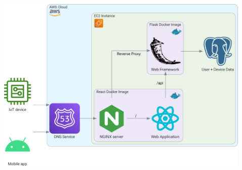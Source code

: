 \documentclass[final]{beamer}
\newlength{\sepwidth}
\newlength{\colwidth}
\newlength{\bigcolwidth}
\newcommand{\separatorcolumn}{\begin{column}{\sepwidth}\end{column}}
\begin{document}
\begin{frame}[t]
\begin{columns}[t]
    \separatorcolumn

  \end{columns}

  \begin{columns}

    \separatorcolumn

    \begin{column}{\bigcolwidth}

      \vskip 0.5cm
      \begin{center}
        \includegraphics[width = 0.95 \textwidth]{data_flow.png}
      \end{center}

    \end{column}

    \separatorcolumn

  \end{columns}

\end{frame}
\end{document}
